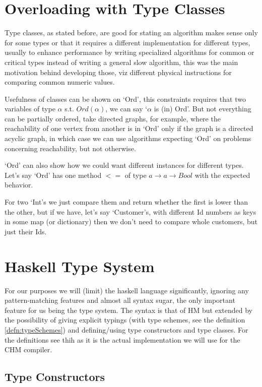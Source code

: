 \section{Overloading with Type Classes}

Type classes, as stated before, are good for stating an algorithm makes sense only for some types or that it requires a different implementation for different types, usually to enhance performance by writing specialized algorithms for common or critical types instead of writing a general slow algorithm, this was the main motivation behind developing those, %
viz different physical instructions for comparing common numeric values.

Usefulness of classes can be shown on `Ord', this constraints requires that two variables of type $\alpha$ s.t. $Ord(\alpha)$, we can say `$\alpha$ is (in) Ord'. But not everything can be partially ordered, take directed graphs, for example, where the reachability of one vertex from another is in `Ord' only if the graph is a directed acyclic graph, in which case we can use algorithms expecting `Ord' on problems concerning reachability, but not otherwise.

`Ord' can also show how we could want different instances for different types. Let's say `Ord' has one method $<=$ of type $a \rightarrow a \rightarrow Bool$ with the expected behavior. %

For two `Int's we just compare them and return whether the first is lower than the other, but if we have, let's say `Customer's, with different Id numbers as keys in some map (or dictionary) then we don't need to compare whole customers, but just their Ids.

\section{Haskell Type System}

For our purposes we will (limit) the haskell language significantly, ignoring any pattern-matching features and almost all syntax sugar, the only important feature for us being the type system. The syntax is that of HM but extended by the possibility of giving explicit typings (with type schemes, see the definition \ref{defn:typeSchemes}) and defining/using type constructors and type classes. For the  definitions see thih \cite{jones1999typing} as it is the actual implementation we will use for the CHM compiler.

\subsection{Type Constructors}

